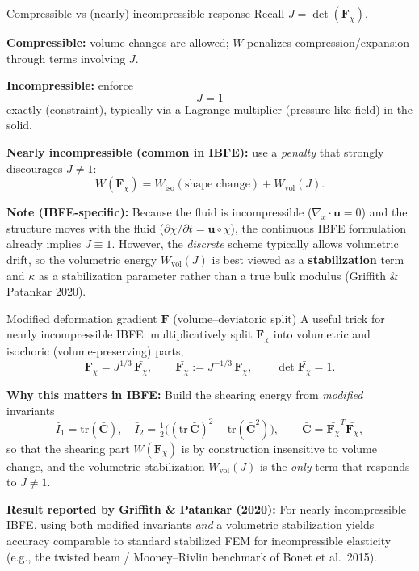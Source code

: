 \documentclass[aspectratio=169]{beamer}
\newcommand{\uEuler}{\bm{u}}
\newcommand{\divx}{\nabla_{\!x}\cdot}
\newcommand{\Cten}{\bm{C}}     %
\newcommand{\Fdef}{\bm{F}_{\chi}}  %
\begin{document}
\begin{frame}{Compressible vs (nearly) incompressible response}
\small
Recall \(J=\det(\Fdef)\).

\medskip
\textbf{Compressible:} volume changes are allowed; \(W\) penalizes compression/expansion through terms involving \(J\).

\medskip
\textbf{Incompressible:} enforce
\[
J=1
\]
exactly (constraint), typically via a Lagrange multiplier (pressure-like field) in the solid.

\medskip
\textbf{Nearly incompressible (common in IBFE):} use a \emph{penalty} that strongly discourages \(J\neq 1\):
\[
W(\Fdef) = W_{\mathrm{iso}}(\text{shape change}) + W_{\mathrm{vol}}(J).
\]

\medskip
\textbf{Note (IBFE-specific):} Because the fluid is incompressible (\(\divx\uEuler = 0\)) and the structure moves with the fluid (\(\partial \chi/\partial t = \uEuler\circ\chi\)), the continuous IBFE formulation already implies \(J\equiv 1\). However, the \emph{discrete} scheme typically allows volumetric drift, so the volumetric energy \(W_{\mathrm{vol}}(J)\) is best viewed as a \textbf{stabilization} term and \(\kappa\) as a stabilization parameter rather than a true bulk modulus (Griffith \& Patankar 2020).

\end{frame}

\begin{frame}{Modified deformation gradient \(\bar{\bm{F}}\) (volume--deviatoric split)}
\small
A useful trick for nearly incompressible IBFE: multiplicatively split \(\Fdef\) into volumetric and isochoric (volume-preserving) parts,
\[
\Fdef = J^{1/3}\,\bar{\Fdef},\qquad
\bar{\Fdef} := J^{-1/3}\,\Fdef,
\qquad \det \bar{\Fdef} = 1.
\]

\medskip
\textbf{Why this matters in IBFE:} Build the shearing energy from \emph{modified} invariants
\[
\bar{I}_1 = \mathrm{tr}(\bar{\Cten}),\quad \bar{I}_2 = \tfrac12\bigl((\mathrm{tr}\,\bar{\Cten})^2-\mathrm{tr}(\bar{\Cten}^2)\bigr),\qquad \bar{\Cten} = \bar{\Fdef}^T \bar{\Fdef},
\]
so that the shearing part \(W(\bar{\Fdef})\) is by construction insensitive to volume change, and the volumetric stabilization \(W_{\mathrm{vol}}(J)\) is the \emph{only} term that responds to \(J\neq 1\).

\medskip
\textbf{Result reported by Griffith \& Patankar (2020):} For nearly incompressible IBFE, using both modified invariants \emph{and} a volumetric stabilization yields accuracy comparable to standard stabilized FEM for incompressible elasticity (e.g., the twisted beam / Mooney--Rivlin benchmark of Bonet et al.\ 2015).

\end{frame}
\end{document}
